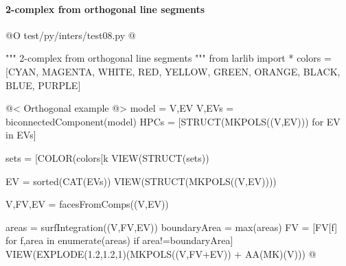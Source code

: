 \documentclass[11pt,oneside]{article}    %
\begin{document}
\paragraph{2-complex from orthogonal line segments}
@O test/py/inters/test08.py
@{""" 2-complex from orthogonal line segments """
from larlib import *
colors = [CYAN, MAGENTA, WHITE, RED, YELLOW, GREEN, ORANGE, BLACK, BLUE, PURPLE]

@< Orthogonal example @>
model = V,EV
V,EVs = biconnectedComponent(model)
HPCs = [STRUCT(MKPOLS((V,EV))) for EV in EVs]

sets = [COLOR(colors[k%
VIEW(STRUCT(sets))

EV = sorted(CAT(EVs))
VIEW(STRUCT(MKPOLS((V,EV))))

V,FV,EV = facesFromComps((V,EV))

areas = surfIntegration((V,FV,EV))
boundaryArea = max(areas)
FV = [FV[f] for f,area in enumerate(areas) if area!=boundaryArea]
VIEW(EXPLODE(1.2,1.2,1)(MKPOLS((V,FV+EV)) + AA(MK)(V)))
@}
\end{document}
